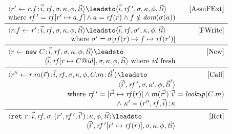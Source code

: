 \begin{figure}[t]
\begin{subfigure}{\columnwidth}
\begin{displaymath}
\begin{array}{lr}
      \multicolumn{2}{r}{
      \langle r' \leftarrow r.f\cpair\vec{i}, \var{rf}, \sigma, \kappa,\phi, \vec{\var{ti}} \rangle
      \leadsto
      \langle \vec{i}, \var{rf}\ \!', \sigma, \kappa,\phi, \vec{\var{ti}} \rangle
      \hspace*{1.1cm}
      \text{[AssnFExt]}} \\
      \multicolumn{1}{r}{\text{where } \var{rf}\ \!' = \var{rf}[r' \mapsto \absval.f]
      \wedge \absval = \var{rf}(r)
      \wedge f \notin \dom(\sigma(\absval))}
      \\ \midrule

      \langle r.f \leftarrow r'\cpair\vec{i},\var{rf},\sigma,\kappa,\phi, \vec{\var{ti}} \rangle
      \leadsto
      \langle \vec{i},\var{rf},\sigma',\kappa,\phi, \vec{\var{ti}} \rangle
      & \text{[FWrite]} \\
      \multicolumn{1}{r}{\text{where } \sigma' = \sigma[\var{rf}(r) \mapsto f \mapsto \var{rf}(r')]}
      \\ \midrule

      \langle r \leftarrow \mathtt{new}\ C\cpair\vec{i}, \var{rf}, \sigma, \kappa,\phi, \vec{\var{ti}} \rangle
      \leadsto
      & \text{[New]} \\
      \multicolumn{1}{r}{
      \langle \vec{i}, \var{rf}[r \mapsto C@\var{id}], \sigma, \kappa,\phi, \vec{\var{ti}} \rangle
      \text{ where } \var{id} \text{ fresh}}
      \\ \midrule

      \langle r'' \leftarrow r.m(\vec{r})\cpair\vec{i}, \var{rf}, \sigma, \kappa, \phi, C.m\cpair\vec{\var{ti}}'
 \rangle
      \leadsto
      & \text{[Call]} \\
      \multicolumn{1}{r}{\langle \vec{i}', \var{rf}\ \!', \sigma, \kappa', \phi, \vec{\var{ti}}' \rangle} \\
      \multicolumn{2}{r}{\text{where } \var{rf}\ \!' = [ \vec{r'} \mapsto \var{rf}(\vec{r}) ]
      \wedge m(\vec{\var{r'}})\ \vec{i}' = \var{lookup}(C.m)} \\
      \multicolumn{1}{r}{\wedge\ \kappa' = (r'', \var{rf}, \vec{i})\cpair\kappa}

      \\ \midrule

      \langle \mathtt{ret}\ r\cpair\vec{i}, \var{rf}, \sigma, (r',\var{rf}\ \!',\vec{i}')\cpair\kappa, \phi, \vec{\var{ti}} \rangle
      \leadsto
      & \text{[Ret]} \\
      \multicolumn{1}{r}{
      \langle \vec{i}', \var{rf}\ \!'[r' \mapsto \var{rf}(r)], \sigma, \kappa, \phi, \vec{\var{ti}} \rangle
      }


\end{array}
\end{displaymath}
\end{subfigure}
\end{figure}
